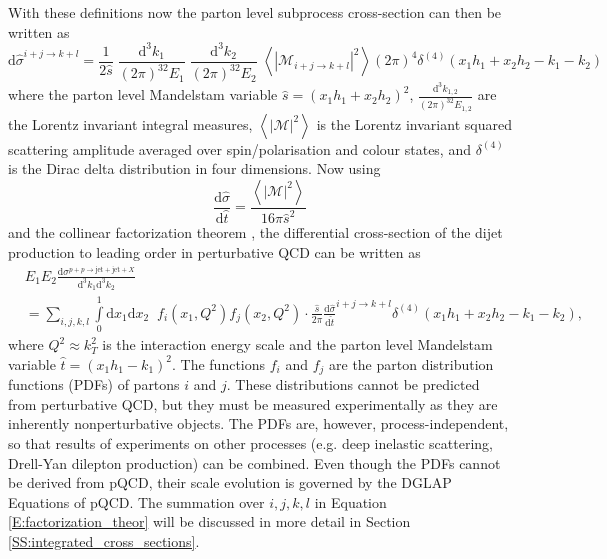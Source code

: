 \documentclass[a4paper, twoside, english, 12pt]{report}
\begin{document}
With these definitions now the parton level subprocess cross-section can then be written as \cite{pqcd} \cite[ch. 4.5]{Peskin}
\begin{equation}
	\text{d}\hat{\sigma}^{i+j\rightarrow k+l} = \frac{1}{2\hat{s}}\;\frac{\text{d}^3k_1}{(2\pi)^32E_1}\;\frac{\text{d}^3k_2}{(2\pi)^32E_2}\; \left\langle|\mathcal{M}_{i+j\rightarrow k+l}|^2\right\rangle (2\pi)^4\delta^{(4)}(x_1h_1+x_2h_2-k_1-k_2)
\end{equation}
where the parton level Mandelstam variable $\hat{s} = (x_1h_1+x_2h_2)^2$, $\frac{\text{d}^3k_{1,2}}{(2\pi)^32E_{1,2}}$ are the Lorentz invariant integral measures, $\left\langle|\mathcal{M}|^2\right\rangle$ is the Lorentz invariant squared scattering amplitude averaged over spin/polarisation and colour states, and $\delta^{(4)}$ is the Dirac delta distribution in four dimensions. Now using \cite{Peskin,hitu}
\begin{equation}
	\frac{\text{d}\hat{\sigma}}{\text{d}\hat{t}} = \frac{\left\langle|\mathcal{M}|^2\right\rangle}{16\pi\hat{s}^2}
\end{equation}
and the collinear factorization theorem \cite[ch. 14.3]{Sterman}, the differential cross-section of the dijet production to leading order in perturbative QCD can be written as
\begin{align}\label{E:factorization_theor}
&E_1E_2\frac{\text{d}\sigma^{p+p\rightarrow\text{jet}+\text{jet}+X}}{\text{d}^3k_1\text{d}^3k_2} \nonumber\\[1em] &= \sum_{i,j,k,l}\int\limits_{0}^{1}\text{d}x_1\text{d}x_2 \;\; f_i(x_1,Q^2) f_j(x_2,Q^2)\cdot \frac{\hat{s}}{2\pi} \frac{\text{d}\hat{\sigma}}{\text{d}\hat{t}}^{i+j\rightarrow k+l}\delta^{(4)}(x_1h_1+x_2h_2-k_1-k_2),
\end{align}
where $Q^2\approx k_T^2$ is the interaction energy scale and the parton level Mandelstam variable $\hat{t} = (x_1h_1-k_1)^2$. The functions $f_i$ and $f_j$ are the parton distribution functions (PDFs) of partons $i$ and $j$. These distributions cannot be predicted from perturbative QCD, but they must be measured experimentally as they are inherently nonperturbative objects. The PDFs are, however, process-independent, so that results of experiments on other processes (e.g. deep inelastic scattering, Drell-Yan dilepton production) can be combined. Even though the PDFs cannot be derived from pQCD, their scale evolution is governed by the DGLAP Equations \cite{DG,L,A,P} of pQCD. The summation over $i,j,k,l$ in Equation \eqref{E:factorization_theor} will be discussed in more detail in Section \ref{SS:integrated_cross_sections}.
\end{document}
